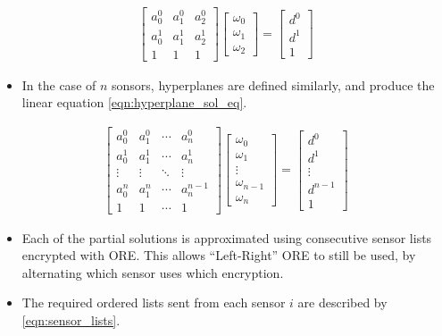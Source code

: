 \documentclass[letterpaper, 10 pt, conference]{ieeeconf}  %
\begin{document}
\begin{gather}
   \begin{bmatrix}
      a_0^0 & a_1^0 & a_2^0 \\
      a_0^1 & a_1^1 & a_2^1 \\
      1 & 1 & 1
   \end{bmatrix}
   \begin{bmatrix}
      \omega_0 \\
      \omega_1 \\
      \omega_2
   \end{bmatrix}
   =
   \begin{bmatrix}
      d^0 \\
      d^1 \\
      1
   \end{bmatrix} \label{eqn:3sen_plane_sol_eq}
\end{gather}
\begin{itemize}
   \item In the case of $n$ sonsors, hyperplanes are defined similarly, and produce the linear equation \eqref{eqn:hyperplane_sol_eq}.
\end{itemize}
\begin{gather}
   \begin{bmatrix}
      a_0^0 & a_1^0 & \cdots & a_n^0 \\
      a_0^1 & a_1^1 & \cdots & a_n^1 \\
      \vdots & \vdots & \ddots & \vdots \\
      a_0^n & a_1^n & \cdots & a_n^{n-1} \\
      1 & 1 & \cdots & 1
   \end{bmatrix}
   \begin{bmatrix}
      \omega_0 \\
      \omega_1 \\
      \vdots \\
      \omega_{n-1} \\
      \omega_n
   \end{bmatrix}
   =
   \begin{bmatrix}
      d^0 \\
      d^1 \\
      \vdots \\
      d^{n-1} \\
      1
   \end{bmatrix} \label{eqn:hyperplane_sol_eq}
\end{gather}
\begin{itemize}
   \item Each of the partial solutions is approximated using consecutive sensor lists encrypted with ORE. This allows ``Left-Right'' ORE to still be used, by alternating which sensor uses which encryption.
   \item The required ordered lists sent from each sensor $i$ are described by \eqref{eqn:sensor_lists}.
\end{itemize}
\end{document}
